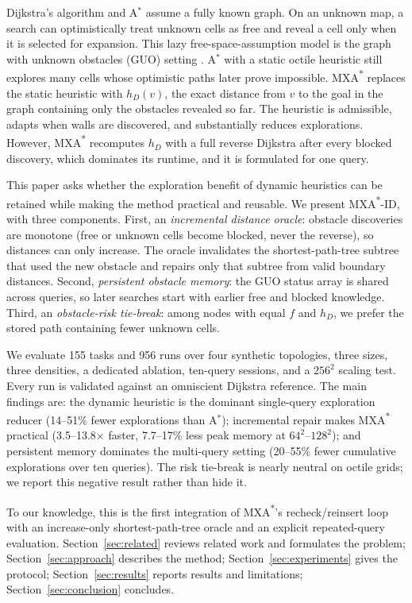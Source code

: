 \documentclass[conference]{IEEEtran}
\newcommand{\hD}{h_{D}}
\newcommand{\MXA}{MXA\textsuperscript{*}}
\newcommand{\MXAID}{MXA\textsuperscript{*}-ID}
\begin{document}
Dijkstra's algorithm \cite{dijkstra1959} and A$^*$ \cite{hart1968} assume a fully known graph. On an unknown map, a search can optimistically treat unknown cells as free and reveal a cell only when it is selected for expansion. This lazy free-space-assumption model is the graph with unknown obstacles (GUO) setting \cite{koenig2003,korf1990}. A$^*$ with a static octile heuristic still explores many cells whose optimistic paths later prove impossible. \MXA{} \cite{koyfman2024} replaces the static heuristic with $\hD(v)$, the exact distance from $v$ to the goal in the graph containing only the obstacles revealed so far. The heuristic is admissible, adapts when walls are discovered, and substantially reduces explorations. However, \MXA{} recomputes $\hD$ with a full reverse Dijkstra after every blocked discovery, which dominates its runtime, and it is formulated for one query.

This paper asks whether the exploration benefit of dynamic heuristics can be retained while making the method practical and reusable. We present \MXAID, with three components. First, an \emph{incremental distance oracle}: obstacle discoveries are monotone (free or unknown cells become blocked, never the reverse), so distances can only increase. The oracle invalidates the shortest-path-tree subtree that used the new obstacle and repairs only that subtree from valid boundary distances. Second, \emph{persistent obstacle memory}: the GUO status array is shared across queries, so later searches start with earlier free and blocked knowledge. Third, an \emph{obstacle-risk tie-break}: among nodes with equal $f$ and $\hD$, we prefer the stored path containing fewer unknown cells.

We evaluate 155 tasks and 956 runs over four synthetic topologies, three sizes, three densities, a dedicated ablation, ten-query sessions, and a $256^2$ scaling test. Every run is validated against an omniscient Dijkstra reference. The main findings are: the dynamic heuristic is the dominant single-query exploration reducer (14--51\% fewer explorations than A$^*$); incremental repair makes \MXA{} practical (3.5--13.8$\times$ faster, 7.7--17\% less peak memory at $64^2$--$128^2$); and persistent memory dominates the multi-query setting (20--55\% fewer cumulative explorations over ten queries). The risk tie-break is nearly neutral on octile grids; we report this negative result rather than hide it.

To our knowledge, this is the first integration of \MXA{}'s recheck/reinsert loop with an increase-only shortest-path-tree oracle and an explicit repeated-query evaluation. Section~\ref{sec:related} reviews related work and formulates the problem; Section~\ref{sec:approach} describes the method; Section~\ref{sec:experiments} gives the protocol; Section~\ref{sec:results} reports results and limitations; Section~\ref{sec:conclusion} concludes.
\end{document}

